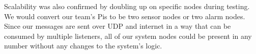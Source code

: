 Scalability was also confirmed by doubling up on specific nodes during testing. We would convert our team's Pis to be
two sensor nodes or two alarm nodes. Since our messages are sent over UDP and internet in a way that can be consumed by
multiple listeners, all of our system nodes could be present in any number without any changes to the system's logic.
